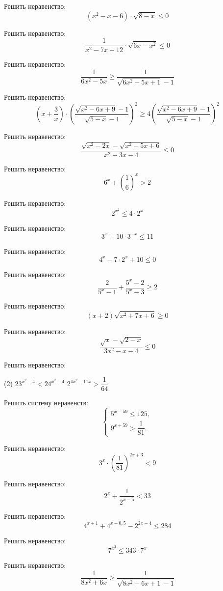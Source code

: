 \begin{class}[number=ЖАРИЩА]
	\begin{listofex}
		\item Решить неравенство:
		\[ (x^2-x-6)\cdot\sqrt{8-x}\le0 \]
		\item Решить неравенство:
		\[ \dfrac{1}{x^2-7x+12}\cdot\sqrt{6x-x^2}\le0 \]
		\item Решить неравенство:
		\[ \dfrac{1}{6x^2-5x}\ge\dfrac{1}{\sqrt{6x^2-5x+1}-1} \]
		\item Решить неравенство:
		\[ \left( x+\dfrac{3}{x} \right)\cdot\left( \dfrac{\sqrt{x^2-6x+9}-1}{\sqrt{5-x}-1} \right)^2\ge4\left( \dfrac{\sqrt{x^2-6x+9}-1}{\sqrt{5-x}-1} \right)^2 \]
		\item Решить неравенство:
		\[ \dfrac{\sqrt{x^2-2x}-\sqrt{x^2-5x+6}}{x^2-3x-4}\le0 \]
		\item Решить неравенство:
		\[ 6^x+\left( \dfrac{1}{6} \right)^x>2 \]
		\item Решить неравенство:
		\[ 2^{x^2}\le4\cdot2^x \]
		\item Решить неравенство:
		\[ 3^x+10\cdot3^{-x}\le11 \]
		\item Решить неравенство:
		\[ 4^x-7\cdot2^x+10\le0 \]
		\item Решить неравенство:
		\[ \dfrac{2}{5^x-1}+\dfrac{5^x-2}{5^x-3}\ge2 \]
	\end{listofex}
\end{class}

\begin{class}[number=6]
	\begin{listofex}
		\item Решить неравенство:
		\[ (x+2)\sqrt{x^2+7x+6}\ge0 \]
		\item Решить неравенство:
		\[ \dfrac{\sqrt{x}-\sqrt{2-x}}{3x^2-x-4}\le0 \]
		\item Решить неравенство:
		\begin{tasks}(2)
			\task \( 23^{x^2-4}<24^{x^2-4} \)
			\task \( 2^{4x^2-11x}>\dfrac{1}{64} \)
		\end{tasks}
		\item Решить систему неравенств:
		\[ \left\{
		\begin{array}{l}
			5^{x-59}\le125,\\
			9^{x+59}>\dfrac{1}{81}.
		\end{array}
		\right. \]
		\item Решить неравенство:
		\[ 3^x\cdot\left( \dfrac{1}{81} \right)^{2x+3}<9 \]
		\item Решить неравенство:
		\[ 2^x+\dfrac{1}{2^{x-5}}<33 \]
		\item Решить неравенство:
		\[ 4^{x+1}+4^{x-0,5}-2^{2x-4}\le284 \]
		\item Решить неравенство:
		\[ 7^{x^2}\le343\cdot7^x \]
		\item Решить неравенство:
		\[ \dfrac{1}{8x^2+6x}\ge\dfrac{1}{\sqrt{8x^2+6x+1}-1} \]
	\end{listofex}
\end{class}

